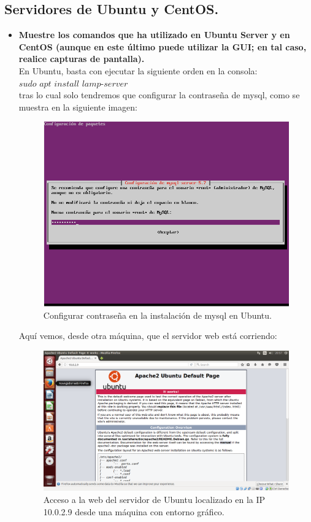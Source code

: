 \subsection{Servidores de Ubuntu y CentOS.}
\begin{itemize}
	\item \textbf{Muestre los comandos que ha utilizado en Ubuntu Server y en CentOS (aunque en este último puede utilizar la GUI; en tal caso, realice capturas de pantalla).}\\
	
	En Ubuntu, basta con ejecutar la siguiente orden en la consola:\\
	
	$sudo$ $apt$ $install$ $lamp$-$server$\^\\
	
	tras lo cual solo tendremos que configurar la contraseña de mysql, como se muestra en la siguiente imagen:\\
	
	\begin{figure}[H]
	\centering
	\includegraphics[width=0.7\linewidth]{Contrasena_mysql}
	\caption[Configurar contraseña]{Configurar contraseña en la instalación de mysql en Ubuntu.}
	\label{fig:Contraseña_mysql}
	\end{figure}
	
	Aquí vemos, desde otra máquina, que el servidor web está corriendo:\\
	
	\begin{figure}[H]
	\centering
	\includegraphics[width=0.7\linewidth]{Acceso_web_UbuntuServer}
	\caption[Acceso Web a Ubuntu]{Acceso a la web del servidor de Ubuntu localizado en la IP 10.0.2.9 desde una máquina con entorno gráfico.}
	\label{fig:Acceso_web_UbuntuServer}
	\end{figure}


\end{itemize}
